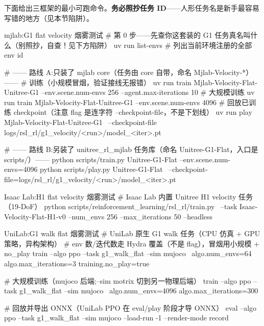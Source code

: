 下面给出三框架的最小可跑命令。\textbf{务必照抄任务 ID}——人形任务名是新手最容易写错的地方（见本节陷阱）。

\begin{codebox}[bash]{mjlab:G1 flat velocity 烟雾测试}
# 第 0 步——先查你这套装的 G1 任务真名叫什么（别照抄，自查！见下方陷阱）
uv run list-envs        # 列出当前环境注册的全部 env id

# —— 路线 A:只装了 mjlab core（任务由 core 自带，命名 Mjlab-Velocity-*）——
# 训练（小规模冒烟，验证接线无报错）
uv run train Mjlab-Velocity-Flat-Unitree-G1 --env.scene.num-envs 256 --agent.max-iterations 10
# 大规模训练
uv run train Mjlab-Velocity-Flat-Unitree-G1 --env.scene.num-envs 4096
# 回放已训练 checkpoint（注意 flag 是连字符 --checkpoint-file，不是下划线）
uv run play Mjlab-Velocity-Flat-Unitree-G1 \
  --checkpoint-file logs/rsl_rl/g1_velocity/<run>/model_<iter>.pt

# —— 路线 B:另装了 unitree_rl_mjlab 任务库（命名 Unitree-G1-Flat，入口是 scripts/）——
python scripts/train.py Unitree-G1-Flat --env.scene.num-envs=4096
python scripts/play.py Unitree-G1-Flat \
  --checkpoint-file=logs/rsl_rl/g1_velocity/<run>/model_<iter>.pt
\end{codebox}

\begin{codebox}[bash]{Isaac Lab:H1 flat velocity 烟雾测试}
# Isaac Lab 内置 Unitree H1 velocity 任务（19-DoF）
python scripts/reinforcement_learning/rsl_rl/train.py \
  --task Isaac-Velocity-Flat-H1-v0 --num_envs 256 --max_iterations 50 --headless
\end{codebox}

\begin{codebox}[bash]{UniLab:G1 walk flat 烟雾测试}
# UniLab 原生 G1 walk 任务（CPU 仿真 + GPU 策略，异构架构）
# env 数/迭代数走 Hydra 覆盖（不是 flag），冒烟用小规模 + no_play
train --algo ppo --task g1_walk_flat --sim mujoco \
    algo.num_envs=64 algo.max_iterations=3 training.no_play=true

# 大规模训练（mujoco 后端;--sim motrix 切到另一物理后端）
train --algo ppo --task g1_walk_flat --sim mujoco \
    algo.num_envs=4096 algo.max_iterations=300

# 回放并导出 ONNX（UniLab PPO 在 eval/play 阶段才导 ONNX）
eval --algo ppo --task g1_walk_flat --sim mujoco --load-run -1 --render-mode record
\end{codebox}


